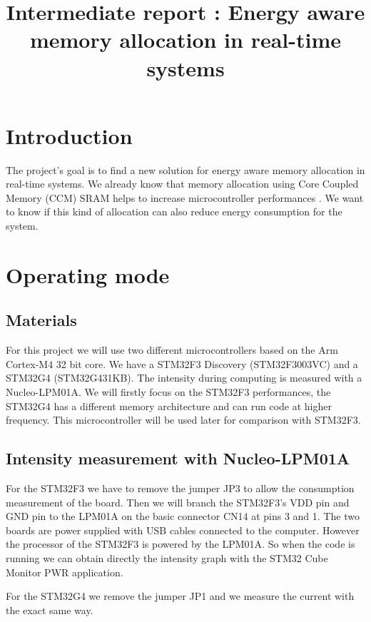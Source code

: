 \documentclass[conference]{IEEEtran}
\title{Intermediate report : Energy aware memory allocation in real-time systems}
\begin{document}
\maketitle


\section{Introduction}
\label{introduction}

The project's goal is to find a new solution for energy aware memory allocation
in real-time systems. We already know that memory allocation using Core Coupled
Memory (CCM) SRAM helps to increase microcontroller performances
\cite{mem_alloc}. We want to know if this kind of allocation can also reduce
energy consumption for the system. 

\section{Operating mode}

\subsection{Materials}
For this project we will use two different microcontrollers based on the Arm
Cortex-M4 32 bit core. We have a STM32F3 Discovery (STM32F3003VC) and a STM32G4
(STM32G431KB). The intensity during computing is measured with a Nucleo-LPM01A.
We will firstly focus on the STM32F3 performances, the STM32G4 has a different
memory architecture and can run code at higher frequency. This microcontroller
will be used later for comparison with STM32F3. 

\subsection{Intensity measurement with Nucleo-LPM01A}
For the STM32F3 we have to remove the jumper JP3 to allow the consumption
measurement of the board. Then we will branch the STM32F3's VDD pin and GND pin
to the LPM01A on the basic connector CN14 at pins 3 and 1. The two boards are
power supplied with USB cables connected to the computer. However the processor
of the STM32F3 is powered by the LPM01A. So when the code is running we can
obtain directly the intensity graph with the STM32 Cube Monitor PWR application.
\cite{low_power} 

For the STM32G4 we remove the jumper JP1 and we measure the current with the
exact same way. 
\end{document}
